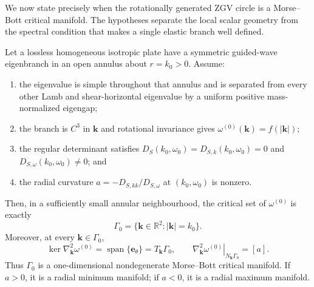 We now state precisely when the rotationally generated ZGV circle is a
Morse--Bott critical manifold.  The hypotheses separate the local scalar
geometry from the spectral condition that makes a single elastic branch
well defined.

\begin{theorem}
\label{thm:morse-bott-ring}
Let a lossless homogeneous isotropic plate have a symmetric guided-wave
eigenbranch in an open annulus about \(r=k_0>0\).  Assume:
\begin{enumerate}
  \item the eigenvalue is simple throughout that annulus and is separated
        from every other Lamb and shear-horizontal eigenvalue by a uniform
        positive mass-normalized eigengap;
  \item the branch is \(C^3\) in \(\mathbf{k}\) and rotational invariance
        gives \(\omega^{(0)}(\mathbf{k})=f(|\mathbf{k}|)\);
  \item the regular determinant satisfies
        \(D_S(k_0,\omega_0)=D_{S,k}(k_0,\omega_0)=0\) and
        \(D_{S,\omega}(k_0,\omega_0)\neq0\); and
  \item the radial curvature
        \(a=-D_{S,kk}/D_{S,\omega}\) at \((k_0,\omega_0)\) is nonzero.
\end{enumerate}
Then, in a sufficiently small annular neighbourhood, the critical set of
\(\omega^{(0)}\) is exactly
\begin{equation}
  \Gamma_0=\{\mathbf{k}\in\mathbb{R}^2:|\mathbf{k}|=k_0\}.
  \label{eq:isotropic-critical-ring}
\end{equation}
Moreover, at every \(\mathbf{k}\in\Gamma_0\),
\begin{equation}
  \ker\nabla_{\mathbf{k}}^2\omega^{(0)}
  =\operatorname{span}\{\mathbf{e}_\theta\}
  =T_{\mathbf{k}}\Gamma_0,
  \qquad
  \left.\nabla_{\mathbf{k}}^2\omega^{(0)}\right|_{N_{\mathbf{k}}\Gamma_0}
  =[a].
  \label{eq:morse-bott-kernel-and-normal-form}
\end{equation}
Thus \(\Gamma_0\) is a one-dimensional nondegenerate Morse--Bott critical
manifold.  If \(a>0\), it is a radial minimum manifold; if \(a<0\), it is a
radial maximum manifold.
\end{theorem}

